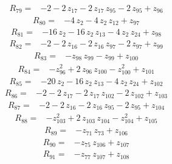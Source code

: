 \documentclass[10pt]{article}
\begin{document}
\begin{align*}
R_{79}={}& - 2 - 2\,z_{17} - 2\,z_{17}\,z_{95} - 2\,z_{95} + z_{96}
\end{align*}
\begin{align*}
R_{80}={}& - 4\,z_{2} - 4\,z_{2}\,z_{12} + z_{97}
\end{align*}
\begin{align*}
R_{81}={}& - 16\,z_{2} - 16\,z_{2}\,z_{13} - 4\,z_{2}\,z_{24} + z_{98}
\end{align*}
\begin{align*}
R_{82}={}& - 2 - 2\,z_{16} - 2\,z_{16}\,z_{97} - 2\,z_{97} + z_{99}
\end{align*}
\begin{align*}
R_{83}={}& - z_{98}\,z_{99} - z_{99} + z_{100}
\end{align*}
\begin{align*}
R_{84}={}& - z_{96}^{2} + 2\,z_{96}\,z_{100} - z_{100}^{2} + z_{101}
\end{align*}
\begin{align*}
R_{85}={}& - 20\,z_{2} - 16\,z_{2}\,z_{13} - 4\,z_{2}\,z_{24} + z_{102}
\end{align*}
\begin{align*}
R_{86}={}& - 2 - 2\,z_{17} - 2\,z_{17}\,z_{102} - 2\,z_{102} + z_{103}
\end{align*}
\begin{align*}
R_{87}={}& - 2 - 2\,z_{16} - 2\,z_{16}\,z_{95} - 2\,z_{95} + z_{104}
\end{align*}
\begin{align*}
R_{88}={}& - z_{103}^{2} + 2\,z_{103}\,z_{104} - z_{104}^{2} + z_{105}
\end{align*}
\begin{align*}
R_{89}={}& - z_{71}\,z_{73} + z_{106}
\end{align*}
\begin{align*}
R_{90}={}& - z_{75}\,z_{106} + z_{107}
\end{align*}
\begin{align*}
R_{91}={}& - z_{77}\,z_{107} + z_{108}
\end{align*}
\end{document}
